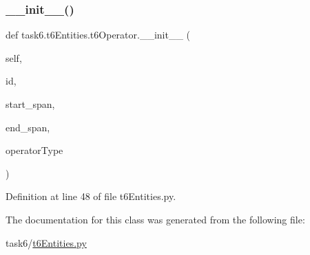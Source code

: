 \subsubsection{\texorpdfstring{\+\_\+\+\_\+init\+\_\+\+\_\+()}{\_\_init\_\_()}}
{\footnotesize\ttfamily def task6.\+t6\+Entities.\+t6\+Operator.\+\_\+\+\_\+init\+\_\+\+\_\+ (\begin{DoxyParamCaption}\item[{}]{self,  }\item[{}]{id,  }\item[{}]{start\+\_\+span,  }\item[{}]{end\+\_\+span,  }\item[{}]{operator\+Type }\end{DoxyParamCaption})}



Definition at line 48 of file t6\+Entities.\+py.



The documentation for this class was generated from the following file\+:\begin{DoxyCompactItemize}
\item 
task6/\hyperlink{t6Entities_8py}{t6\+Entities.\+py}\end{DoxyCompactItemize}

